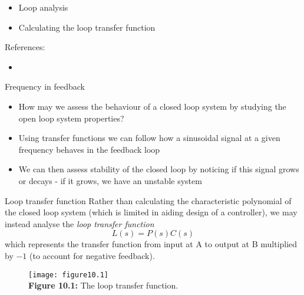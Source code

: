 \documentclass{beamer-control}
\begin{document}

\begin{SUMMARY}
\begin{itemize}
\item Loop analysis
\item Calculating the loop transfer function
\end{itemize}
\vfill References:
\begin{itemize}
\item {}
\end{itemize}
\end{SUMMARY}




\begin{frame}{Frequency in feedback}
\begin{itemize}
\item How may we assess the behaviour of a closed loop system by studying the open loop system properties?
\item Using transfer functions we can follow how a sinusoidal signal at a given frequency behaves in the feedback loop
\item We can then assess stability of the closed loop by noticing if this signal grows or decays - if it grows, we have an unstable system
\end{itemize}
\end{frame}

\begin{frame}{Loop transfer function}
Rather than calculating the characteristic polynomial of the closed loop system (which is limited in aiding design of a controller), we may instead analyse the \textit{loop transfer function}
\[L(s)=P(s)C(s)\]
which represents the transfer function from input at A to output at B multiplied by $-1$ (to account for negative feedback).

\begin{figure}
	\centering
	\texttt{[image: figure10.1]}
	\\
	\textbf{Figure 10.1:} The loop transfer function.
\end{figure}
\end{frame}
\end{document}
